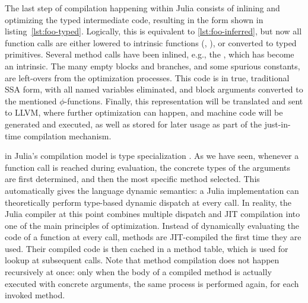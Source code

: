 The last step of compilation happening within Julia consists of inlining and optimizing the typed
intermediate code, resulting in the form shown in listing~\ref{lst:foo-typed}.  Logically, this is
equivalent to \ref{lst:foo-inferred}, but now all function calls are either lowered to intrinsic
functions (, ), or converted to typed  primitives.
Several method calls have been inlined, e.g., the \jlinl{+}, which has become an 
intrinsic.  The many empty blocks and branches, and some spurious constants, are left-overs from the
optimization processes.  This code is in true, traditional SSA form, with all named variables
eliminated, and block arguments converted to the mentioned \(\phi\)-functions.  Finally, this
representation will be translated and sent to LLVM, where further optimization can happen, and
machine code will be generated and executed, as well as stored for later usage as part of the
just-in-time compilation mechanism.

 in Julia's compilation model is type specialization
\parencite{bezanson2018julia}.  As we have seen, whenever a function call is reached during
evaluation, the concrete types of the arguments are first determined, and then the most specific
method selected.  This automatically gives the language dynamic semantics: a Julia implementation
can theoretically perform type-based dynamic dispatch at every call.  In reality, the Julia compiler
at this point combines multiple dispatch and JIT compilation into one of the main principles of
optimization.  Instead of dynamically evaluating the code of a function at every call, methods are
JIT-compiled the first time they are used.  Their compiled code is then cached in a method table,
which is used for lookup at subsequent calls.  Note that method compilation does not happen
recursively at once: only when the body of a compiled method is actually executed with concrete
arguments, the same process is performed again, for each invoked method.

